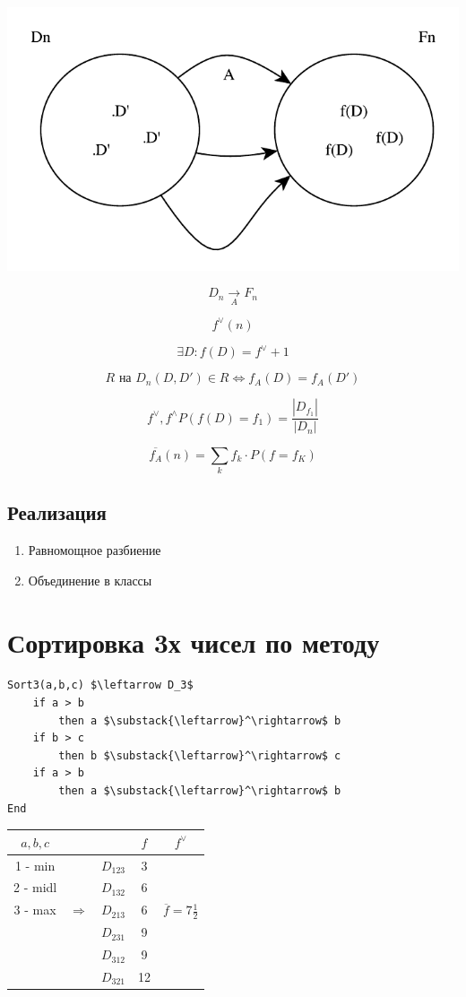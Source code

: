 \documentclass[a4paper, 14pt]{report}
\begin{document}
\includegraphics{anal3}

$$
D_n \underset{A}{\to} F_n
$$

$$
f^\vee(n)
$$

$$
\exists D : f(D) = f^\vee + 1
$$

$$
R \text{ на } D_n (D,D') \in R \Leftrightarrow f_A(D) = f_A(D')
$$

$$
f^\vee, f^\wedge P(f(D) = f_1) = \frac{|D_{f_1}|}{|D_n|}
$$

$$
\overline{f_A}(n) = \sum_k f_k \cdot P(f = f_K)
$$

\subsection{Реализация}

\begin{enumerate}
    \item Равномощное разбиение
    \item Объединение в классы
\end{enumerate}

\section{Сортировка 3х чисел по методу}

\begin{lstlisting}
Sort3(a,b,c) $\leftarrow D_3$
    if a > b
        then a $\substack{\leftarrow}^\rightarrow$ b
    if b > c
        then b $\substack{\leftarrow}^\rightarrow$ c
    if a > b
        then a $\substack{\leftarrow}^\rightarrow$ b
End
\end{lstlisting}

\begin{tabular}{ccccc}
    $a,b,c$  & &           & $f$ & $f^\vee$ \\
    \hline
    1 - min  & & $D_{123}$ & 3   & \\
    2 - midl & & $D_{132}$ & 6   & \\
    3 - max  & $\Rightarrow$ & $D_{213}$ & 6   & $\overline{f} = 7 \frac{1}{2}$\\
             & & $D_{231}$ & 9   & \\
             & & $D_{312}$ & 9   & \\
             & & $D_{321}$ & 12  & \\
\end{tabular}
\end{document}
